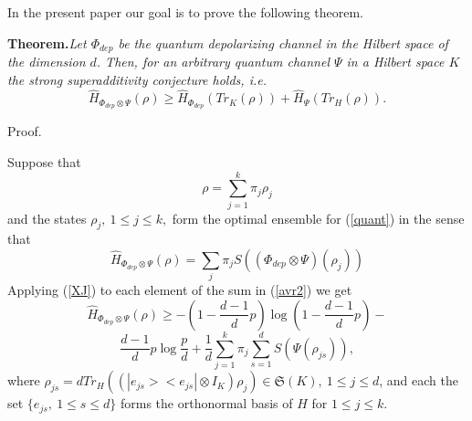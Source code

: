 \documentclass[twocolumn,showpacs,preprintnumbers,amsmath,amssymb]{revtex4}
\begin{document}
In the present paper our goal is to prove the following theorem.


{\bf Theorem.}{\it Let $\Phi _{dep}$ be the quantum depolarizing
channel in the Hilbert space of the dimension $d$. Then, for an
arbitrary quantum channel $\Psi $ in a Hilbert space $K$ the
strong superadditivity conjecture holds, i.e.
\begin {equation}\label {theorem}
\hat H_{\Phi _{dep}\otimes \Psi}(\rho)\ge \hat H_{\Phi
_{dep}}(Tr_{K}(\rho))+\hat H_{\Psi}(Tr_{H}(\rho)).
\end {equation}
}


Proof.



Suppose that
\begin {equation}\label {avr}
\rho =\sum \limits _{j=1}^{k}\pi _{j}\rho _{j}
\end {equation}
and the states $\rho _{j},\ 1\le j\le k,$ form the optimal
ensemble for (\ref {quant}) in the sense that
\begin {equation}\label {avr2}
\hat H_{\Phi _{dep}\otimes \Psi}(\rho)=\sum \limits _{j} \pi
_{j}S((\Phi _{dep}\otimes \Psi)(\rho _{j}))
\end {equation}
Applying (\ref {XJ}) to each element of the sum in (\ref {avr2})
we get
\begin {equation}\label {A1}
\hat H_{\Phi _{dep}\otimes \Psi}(\rho)\ge -(1-\frac
{d-1}{d}p)\log (1-\frac {d-1}{d}p)-
\end {equation}
$$
\frac {d-1}{d}p\log \frac {p}{d}+\frac {1}{d}\sum \limits
_{j=1}^{k}\pi _{j}\sum \limits _{s=1}^{d}S(\Psi (\rho_{js})),
$$
where $\rho_{js}=dTr_{H}((|e_{js}><e_{js}|\otimes I_{K})\rho
_{j})\in \mathfrak {S} (K),\ 1\le j\le d$, and each the set
$\{e_{js},\ 1\le s\le d\}$ forms the orthonormal basis of $H$ for
$1\le j\le k$.
\end{document}
